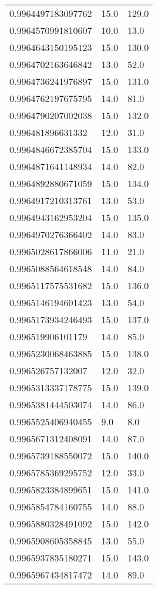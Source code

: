 \begin{center}
\begin{supertabular}[H]{p{0.30\textwidth}p{0.05\textwidth}p{0.05\textwidth}}
0.9964497183097762 & 15.0 & 129.0 \\ 
0.9964570991810607 & 10.0 & 13.0 \\ 
0.9964643150195123 & 15.0 & 130.0 \\ 
0.9964702163646842 & 13.0 & 52.0 \\ 
0.9964736241976897 & 15.0 & 131.0 \\ 
0.9964762197675795 & 14.0 & 81.0 \\ 
0.9964790207002038 & 15.0 & 132.0 \\ 
0.996481896631332 & 12.0 & 31.0 \\ 
0.9964846672385704 & 15.0 & 133.0 \\ 
0.9964871641148934 & 14.0 & 82.0 \\ 
0.9964892880671059 & 15.0 & 134.0 \\ 
0.9964917210313761 & 13.0 & 53.0 \\ 
0.9964943162953204 & 15.0 & 135.0 \\ 
0.9964970276366402 & 14.0 & 83.0 \\ 
0.9965028617866006 & 11.0 & 21.0 \\ 
0.9965088564618548 & 14.0 & 84.0 \\ 
0.9965117575531682 & 15.0 & 136.0 \\ 
0.9965146194601423 & 13.0 & 54.0 \\ 
0.9965173934246493 & 15.0 & 137.0 \\ 
0.996519906101179 & 14.0 & 85.0 \\ 
0.9965230068463885 & 15.0 & 138.0 \\ 
0.996526757132007 & 12.0 & 32.0 \\ 
0.9965313337178775 & 15.0 & 139.0 \\ 
0.9965381444503074 & 14.0 & 86.0 \\ 
0.9965525406940455 & 9.0 & 8.0 \\ 
0.9965671312408091 & 14.0 & 87.0 \\ 
0.9965739188550072 & 15.0 & 140.0 \\ 
0.9965785369295752 & 12.0 & 33.0 \\ 
0.9965823384899651 & 15.0 & 141.0 \\ 
0.9965854784160755 & 14.0 & 88.0 \\ 
0.9965880328491092 & 15.0 & 142.0 \\ 
0.9965908605358845 & 13.0 & 55.0 \\ 
0.9965937835180271 & 15.0 & 143.0 \\ 
0.9965967434817472 & 14.0 & 89.0 \\ 

\end{supertabular}
\end{center}
